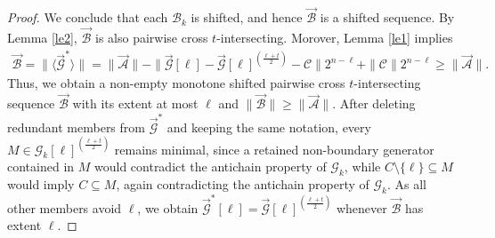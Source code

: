 \documentclass[10pt,a4paper]{amsart}
\begin{document}
\begin{proof}
We conclude that each $\mathcal B_k$ is shifted, and hence
$\vec{\mathcal B}$ is a shifted sequence.
By  Lemma \ref{le2}, $\vec{\mathcal{B}}$ is also pairwise cross $t$-intersecting. 
Morover, Lemma \ref{le1} implies
\begin{align*}
\vec{\mathcal{B}}=\|\langle \vec{\mathcal{G}}^*\rangle\| =\|\vec{\mathcal{A}}\|-\|\vec{\mathcal{G}}[\ell]-\vec{\mathcal{G}}[\ell]^{(\frac{\ell+t}{2})}- \mathcal C\|2^{n-\ell}+\|\mathcal C\|2^{n-\ell}\geq \|\vec{\mathcal{A}}\|.
\end{align*}
Thus, we  obtain a non-empty monotone shifted pairwise cross $t$-intersecting sequence $\vec{\mathcal{B}}$  with its extent at most $\ell$ and $\|\vec{\mathcal{B}}\|\geq \|\vec{\mathcal{A}}\|$. 
After deleting redundant members from $\vec{\mathcal G}^{*}$ and keeping the same notation, every $M\in\mathcal G_k[\ell]^{(\frac{\ell+t}{2})}$ remains minimal, since a retained non-boundary generator contained in $M$ would contradict the antichain property of $\mathcal G_k$, while $C\setminus\{\ell\}\subseteq M$ would imply $C\subseteq M$, again contradicting the antichain property of
$\mathcal G_k$. As all other members avoid $\ell$, we obtain $\vec{\mathcal{G}}^*[\ell]= \vec{\mathcal{G}}[\ell]^{(\frac{\ell+t}{2})}$ whenever $\vec{\mathcal B}$ has extent $\ell$.
\end{proof}
\end{document}
